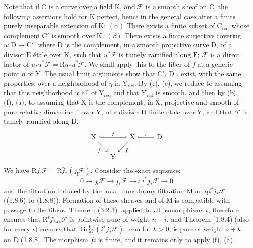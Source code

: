 \documentclass[11pt,leqno]{article}
\begin{document}
Note that if \(\mathrm{C}\) is a curve over a field \(\mathrm{K}\), and \(\mathscr{F}\) is a smooth sheaf on \(\mathrm{C}\), the following assertions hold for \(\mathrm{K}\) perfect, hence in the general case after a finite purely inseparable extension of \(\mathrm{K}\): \((\alpha)\) There exists a finite subset of \(\mathrm{C}_{\mathrm{red}}\) whose complement \(\mathrm{C}'\) is smooth over \(\mathrm{K}\). \((\beta)\) There exists a finite surjective covering \(u:\mathrm{D}\to\mathrm{C}'\), where \(\mathrm{D}\) is the complement, in a smooth projective curve \(\overline{\mathrm{D}}\), of a divisor \(\mathrm{E}\) étale over \(\mathrm{K}\), such that \(u^*\mathscr{F}\) is tamely ramified along \(\mathrm{E}\); \(\mathscr{F}\) is a direct factor of \(u_*u^*\mathscr{F}=\mathrm{R}u_*u^*\mathscr{F}\). We shall apply this to the fiber of \(f\) at a generic point \(\eta\) of \(\mathrm{Y}\). The usual limit arguments show that \(\mathrm{C}'\), \(\mathrm{D}\)\dots{} exist, with the same properties, over a neighborhood of \(\eta\) in \(\mathrm{Y}_{\mathrm{red}}\). By (c), (e), we reduce to assuming that this neighborhood is all of \(\mathrm{Y}_{\mathrm{red}}\) and that \(\mathrm{Y}_{\mathrm{red}}\) is smooth, and then by (b), (f), (a), to assuming that \(\mathrm{X}\) is the complement, in \(\overline{\mathrm{X}}\), projective and smooth of pure relative dimension \(1\) over \(\mathrm{Y}\), of a divisor \(\mathrm{D}\) finite étale over \(\mathrm{Y}\), and that \(\mathscr{F}\) is tamely ramified along \(\mathrm{D}\).
\[
\begin{tikzcd}[ampersand replacement=\&,column sep=1.2em,row sep=1.5em]
\mathrm{X} \arrow[rr,hook,"j"] \arrow[dr,"f"']
\& \&
\overline{\mathrm{X}} \arrow[dl,"\bar f"]
\& \&
\mathrm{D} \arrow[ll,hook',"i"']
\\
\& \mathrm{Y} \& \& \&
\end{tikzcd}
\]
We have \(\mathrm{R}f_!\mathscr{F}=\mathrm{R}\bar{f}_*(j_!\mathscr{F})\). Consider the exact sequence:
\[
0\to j_!\mathscr{F}\to j_*\mathscr{F}
\to i_!i^*j_*\mathscr{F}\to0
\]
and the filtration induced by the local monodromy filtration \(\mathrm{M}\) on \(i_!i^*j_*\mathscr{F}\) ((1.8.6) to (1.8.8)). Formation of these sheaves and of \(\mathrm{M}\) is compatible with passage to the fibers. Theorem (3.2.3), applied to all isomorphisms \(\iota\), therefore ensures that \(\mathrm{R}^i\bar{f}_*j_*\mathscr{F}\) is pointwise pure of weight \(n+i\), and Theorem (1.8.4) (also for every \(\iota\)) ensures that \(\operatorname{Gr}_{\mathrm{M}}^k(i^*j_*\mathscr{F})\), zero for \(k>0\), is pure of weight \(n+k\) on \(\mathrm{D}\) (1.8.8). The morphism \(\bar{f}i\) is finite, and it remains only to apply (f), (a).
\end{document}
